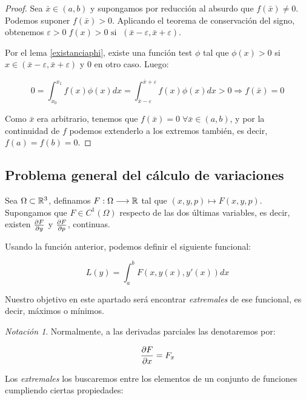 \documentclass[12pt]{article}
\theoremstyle{definition}
\theoremstyle{remark}
\newtheorem{notacion}[theorem]{Notación}
\newcommand{\xcero}{(a,b)}
\newcommand{\fvariaciones}{F(x,y(x),y'(x))}
\begin{document}
\begin{proof}

Sea $\bar{x}\in \xcero$ y supongamos por reducción al absurdo que $f(\bar{x})\neq 0$. Podemos suponer $f(\bar{x})>0$. Aplicando el teorema de conservación del signo, obtenemos $\varepsilon>0 \; f(x)>0 \text{ si } \; (\bar{x}-\varepsilon,\bar{x}+\varepsilon)$.

Por el lema \ref{existanciaphi}, existe una función test $\phi$ tal que $\phi(x)>0$ si $x\in(\bar{x}-\varepsilon, \bar{x}+\varepsilon)$ y $0$ en otro caso. Luego:

\[
0=\int_{x_0}^{x_1}f(x)\phi(x)dx=\int_{\bar{x}-\varepsilon}^{\bar{x}+\varepsilon}f(x)\phi(x)dx>0 \Rightarrow f(\bar{x})=0
\]

Como $\bar{x}$ era arbitrario, tenemos que $f(\bar{x})=0 \; \forall \bar{x}\in\xcero$, y por la continuidad de $f$ podemos extenderlo a los extremos también, es decir, $f(a)=f(b)=0$.

\end{proof}

\subsection{Problema general del cálculo de variaciones}

Sea $\Omega\subset\mathbb{R}^3$, definamos $F:\Omega \longrightarrow \mathbb{R}$ tal que $(x,y,p)\longmapsto F(x,y,p)$. Supongamos que $F\in C^1(\Omega)$  respecto de las dos últimas variables, es decir, existen $\frac{\partial F }{\partial y }$ y $\frac{\partial F }{\partial p }$, continuas. 

Usando la función anterior, podemos definir el siguiente funcional:

\begin{equation}\label{funcional}
L(y) = \int_{a}^{b}\fvariaciones dx 
\end{equation}


Nuestro objetivo en este apartado será encontrar \textit{extremales} de ese funcional, es decir, máximos o mínimos.

\begin{notacion}
Normalmente, a las derivadas parciales las denotaremos por:

\[
\frac{\partial F }{\partial x }=F_x
\]

\end{notacion} 

Los \textit{extremales} los buscaremos entre los elementos de un conjunto de funciones cumpliendo ciertas propiedades:
\end{document}
